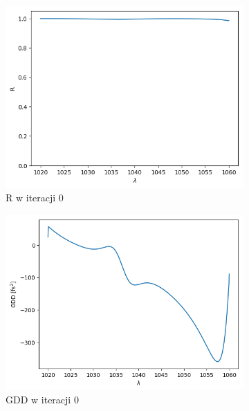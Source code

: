 \begin{figure} [H]
    \centering
    \begin{subfigure}[b]{0.30\textwidth}
        \includegraphics[width=\linewidth]{figures/wyniki/1stopien/opt10^5/result_Rresult0.png}
        \caption{R w iteracji 0}
    \end{subfigure}
            \begin{subfigure}[b]{0.31\textwidth}
        \includegraphics[width=\linewidth]{figures/wyniki/1stopien/opt10^5/result_gddresult0.png}
        \caption{GDD w iteracji 0}
    \end{subfigure}
            \begin{subfigure}[b]{0.32\textwidth}

\end{subfigure}
\end{figure}
